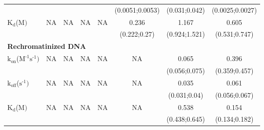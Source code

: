 \begin{table}[H]
\begin{tabular}{lccccccc}
		&                               &                              &                           &                          &(0.0051;0.0053)     &  (0.031;0.042)  & (0.0025;0.0027)  \\
		$\text{K}_{\text{d}}$({\textmu}$\text{M})$                                                  & NA                          &NA                         & NA                      &NA                      &0.236                   &1.167                    &0.605     \\
		&                               &                              &                           &                          &(0.222;0.27)     &  (0.924;1.521)  & (0.531;0.747)  \\
		\multicolumn{8}{l}{\textbf{Rechromatinized DNA}} \\
		$\text{k}_{\text{on}}$({\textmu}$\text{M}^{\text{-1}}\text{s}^{\text{-1}})$    & NA                          & NA                        & NA                      &  NA                    & NA                       &0.065                    &0.396    \\
		&                               &                             &                            &                          &                            &(0.056;0.075)    & (0.359;0.457)    \\
		$\text{k}_{\text{off}}$($\text{s}^{\text{-1}})$                                             & NA                          &NA                          & NA                      & NA                     & NA                       & 0.035                   &0.061     \\
		&                               &                              &                           &                          &                            &  (0.031;0.04)  & (0.056;0.067)  \\
		$\text{K}_{\text{d}}$({\textmu}$\text{M})$                                                  & NA                          &NA                         & NA                      &NA                      &NA                         &0.538                    &0.154     \\
		&                               &                              &                           &                          &                            &  (0.438;0.645)  & (0.134;0.182)  \\
		\hline
	\end{tabular}
	\label{tab:parameter_bigTable}
\end{table}

